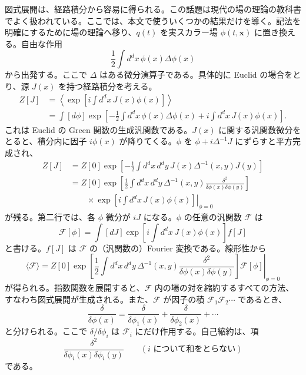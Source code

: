 
図式展開は、経路積分から容易に得られる。この話題は現代の場の理論の教科書でよく扱われている。ここでは、本文で使ういくつかの結果だけを導く。記法を明確にするために場の理論へ移り、$q(t)$ を実スカラー場 $\phi(t,\mathbf x)$ に置き換える。自由な作用
\begin{equation}
\frac12\int d^dx\,\phi(x)\Delta\phi(x)
\tag{A.1.38}\label{eq:A.1.38}
\end{equation}
から出発する。ここで $\Delta$ はある微分演算子である。具体的に Euclid の場合をとり、源 $J(x)$ を持つ経路積分を考える。
\begin{equation}
\begin{aligned}
Z[J]&=\left\langle\exp\left[i\int d^dx\,J(x)\phi(x)\right]\right\rangle\\
&=\int[d\phi]\exp\left[
-\frac12\int d^dx\,\phi(x)\Delta\phi(x)
+i\int d^dx\,J(x)\phi(x)\right].
\end{aligned}
\tag{A.1.39}\label{eq:A.1.39}
\end{equation}
これは Euclid の Green 関数の生成汎関数である。$J(x)$ に関する汎関数微分をとると、積分内に因子 $i\phi(x)$ が降りてくる。$\phi$ を $\phi+i\Delta^{-1}J$ にずらすと平方完成され、
\begin{equation}
\begin{aligned}
Z[J]&=Z[0]\exp\left[
-\frac12\int d^dx\,d^dy\,J(x)\Delta^{-1}(x,y)J(y)\right]\\
&=Z[0]\exp\left[
\frac12\int d^dx\,d^dy\,\Delta^{-1}(x,y)
\frac{\delta^2}{\delta\phi(x)\delta\phi(y)}\right]\\
&\qquad\times
\left.\exp\left[i\int d^dx\,J(x)\phi(x)\right]\right|_{\phi=0}
\end{aligned}
\tag{A.1.40}\label{eq:A.1.40}
\end{equation}
が残る。第二行では、各 $\phi$ 微分が $iJ$ になる。$\phi$ の任意の汎関数 $\mathcal F$ は
\begin{equation}
\mathcal F[\phi]
=\int[dJ]\exp\left[i\int d^dx\,J(x)\phi(x)\right]f[J]
\tag{A.1.41}\label{eq:A.1.41}
\end{equation}
と書ける。$f[J]$ は $\mathcal F$ の（汎関数の）Fourier 変換である。線形性から
\begin{equation}
\langle\mathcal F\rangle
=Z[0]\left.
\exp\left[
\frac12\int d^dx\,d^dy\,\Delta^{-1}(x,y)
\frac{\delta^2}{\delta\phi(x)\delta\phi(y)}\right]\mathcal F[\phi]
\right|_{\phi=0}
\tag{A.1.42}\label{eq:A.1.42}
\end{equation}
が得られる。指数関数を展開すると、$\mathcal F$ 内の場の対を縮約するすべての方法、すなわち図式展開が生成される。また、$\mathcal F$ が因子の積 $\mathcal F_1\mathcal F_2\cdots$ であるとき、
\begin{equation}
\frac{\delta}{\delta\phi(x)}
=\frac{\delta}{\delta\phi_1(x)}
+\frac{\delta}{\delta\phi_2(x)}+\cdots
\tag{A.1.43}\label{eq:A.1.43}
\end{equation}
と分けられる。ここで $\delta/\delta\phi_i$ は $\mathcal F_i$ にだけ作用する。自己縮約は、項
\begin{equation}
\frac{\delta^2}{\delta\phi_i(x)\delta\phi_i(y)}
\qquad(i\text{ について和をとらない})
\tag{A.1.44}\label{eq:A.1.44}
\end{equation}
である。

